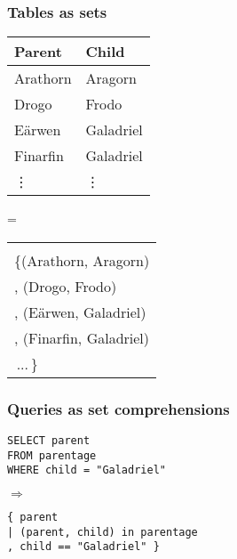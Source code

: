 \documentclass[xcolor=table]{beamer}
\newcommand{\datafuncolor}{\color{blue}}
\begin{document}

\begin{frame}
  \frametitle{Tables as sets}
  \large

  \begin{minipage}{0.4\textwidth}
    \centering
    \begin{tabular}{l|l}
      \textbf{Parent} & \textbf{Child}\\\hline
      Arathorn & Aragorn\\
      Drogo & Frodo\\
      E\"arwen & Galadriel\\
      Finarfin & Galadriel\\
      \rowcolor{white}
      \hfill\vdots & \hfill\vdots
    \end{tabular}


  \end{minipage}
  \hfill{\LARGE =}\hfill
  \begin{minipage}{0.51\textwidth}
    \centering

    \begin{tabular}{l}
      \color{gray}{// set of (parent, child) pairs}\\
      \{\hspace{1pt}(Arathorn, Aragorn)\\
      , (Drogo, Frodo)\\
      , (E\"arwen, Galadriel)\\
      , (Finarfin, Galadriel)\\
      \,...\,\} \phantom{\vdots}
    \end{tabular}

  \end{minipage}

\end{frame}


\begin{frame}
  \frametitle{Queries as set comprehensions}
  \centering\Large

  \begin{minipage}{0.8\textwidth}
    \texttt{SELECT parent\\FROM parentage\\WHERE child = "Galadriel"}
  \end{minipage}

  \vspace{1.5em}
  {\LARGE $\Longrightarrow$}
  \vspace{1em}

  \begin{minipage}{0.8\textwidth}
    \datafuncolor
    \tt \{ parent \\
    | (parent, child) in parentage\\
    , child == "Galadriel" \}
  \end{minipage}

\end{frame}
\end{document}
